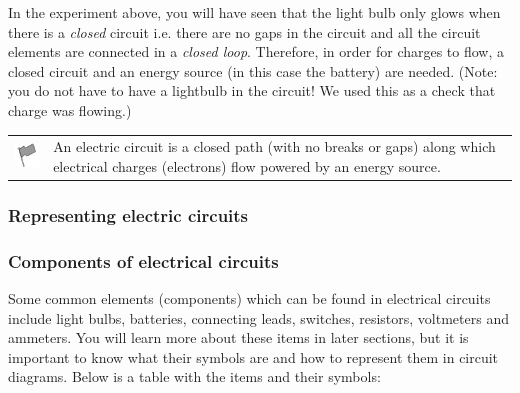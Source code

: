        \label{m38771*id62768}In the experiment above, you will have seen that the light bulb only glows when there is a \textsl{closed} circuit i.e. there are no gaps in the circuit and all the circuit elements are connected in a \textsl{closed loop}. Therefore, in order for charges to flow, a closed circuit and an energy source (in this case the battery) are needed. (Note: you do not have to have a lightbulb in the circuit! We used this as a check that charge was flowing.)\par 
\label{m38771*fhsst!!!underscore!!!id128}\begin{definition}
	  \begin{tabular*}{15 cm}{m{15 mm}m{}}
	\hspace*{-50pt}  \includegraphics[width=0.5in]{col11305.imgs/psflag2.png}   & \Definition{   \label{id2477990}\textbf{ Electric circuit }} { \label{m38771*meaningfhsst!!!underscore!!!id128}
        \label{m38771*id62792}An electric circuit is a closed path (with no breaks or gaps) along which electrical charges (electrons) flow powered by an energy source. \par 
         } 
      \end{tabular*}
      \end{definition}

      
      \label{m38771*uid10}
            \subsubsection{ Representing electric circuits}
            \nopagebreak
            
        
        \label{m38771*uid11}
            \subsubsection{ Components of electrical circuits}
            \nopagebreak
            
          
          \label{m38771*id62821}Some common elements (components) which can be found in electrical circuits include light bulbs, batteries, connecting leads, switches, resistors, voltmeters and ammeters. You will learn more about these items in later sections, but it is important to know what their symbols are and how to represent them in circuit diagrams. Below is a table with the items and their symbols:\par 
          
